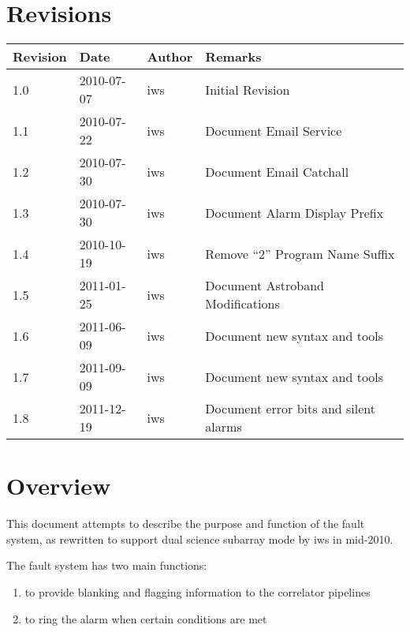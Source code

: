 \documentclass[letterpaper,12pt,oneside,pdftex]{article}
\title{\mytitle}
\author{\myname\\\emaillink{\myemail}}
\date{\today}
\newenvironment{penumerate}{
\begin{enumerate}
  \setlength{\itemsep}{1pt}
  \setlength{\parskip}{0pt}
  \setlength{\parsep}{0pt}
}{\end{enumerate}}
\begin{document}
\sffamily

\maketitle
\clearpage

\tableofcontents
\clearpage

\section{Revisions}

\begin{tabularx}{\textwidth}{lllX}
Revision    & Date          & Author    & Remarks \\ \hline
1.0         & 2010-07-07    & iws       & Initial Revision \\ \hline
1.1         & 2010-07-22    & iws       & Document Email Service \\ \hline
1.2         & 2010-07-30    & iws       & Document Email Catchall \\ \hline
1.3         & 2010-07-30    & iws       & Document Alarm Display Prefix \\ \hline
1.4         & 2010-10-19    & iws       & Remove ``2'' Program Name Suffix \\ \hline
1.5         & 2011-01-25    & iws       & Document Astroband Modifications \\ \hline
1.6         & 2011-06-09    & iws       & Document new syntax and tools \\ \hline
1.7         & 2011-09-09    & iws       & Document new syntax and tools \\ \hline
1.8         & 2011-12-19    & iws       & Document error bits and silent alarms \\ \hline
\end{tabularx}

\section{Overview}

This document attempts to describe the purpose and function of the fault system,
as rewritten to support dual science subarray mode by iws in mid-2010.

The fault system has two main functions:
\begin{penumerate}
\item to provide blanking and flagging information to the correlator pipelines
\item to ring the alarm when certain conditions are met
\end{penumerate}
\end{document}
